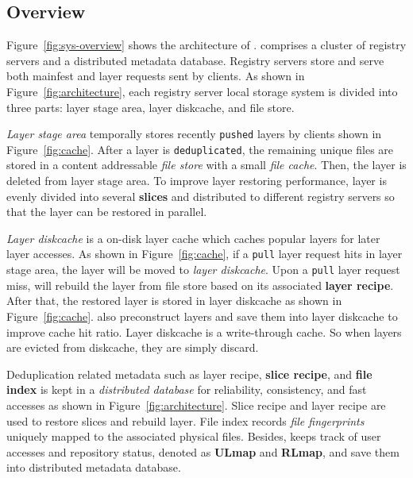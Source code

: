 \vspace{-4pt}
\subsection{Overview}
\label{sec:design}
\vspace{-4pt}


%

Figure~\ref{fig:sys-overview} shows the architecture of \sysname.
 \sysname comprises a cluster of registry servers and a distributed metadata database. 
Registry servers store and serve both mainfest and layer requests sent by clients.
As shown in Figure~\ref{fig:architecture}, 
each registry server local storage system is
divided into three parts: layer stage area, layer diskcache, and file store.

\emph{Layer stage area} temporally stores recently \texttt{pushed} layers by clients shown in Figure~\ref{fig:cache}.
After a layer is \texttt{deduplicated}, 
the remaining unique files are stored in a content 
addressable \emph{file store} with a small \emph{file cache}. 
Then, the layer is deleted from layer stage area.
To improve layer restoring performance, 
layer is evenly divided into several \textbf{slices} and distributed to different registry servers so that
the layer can be restored in parallel.
  
\emph{Layer diskcache} is a on-disk layer cache which caches popular layers for later layer accesses.
As shown in Figure~\ref{fig:cache}, 
if a \texttt{pull} layer request hits in layer stage area,
the layer will be moved to \emph{layer diskcache}.
%
Upon a \texttt{pull} layer request miss, \sysname will rebuild the layer from file store
based on its associated \textbf{layer recipe}. 
After that, the restored layer is stored in layer diskcache as shown in Figure~\ref{fig:cache}.
\sysname also preconstruct layers and save them into layer diskcache to improve cache hit ratio. 
Layer diskcache is a write-through cache.
So when layers are evicted from diskcache, they are simply discard.

Deduplication related metadata such as layer recipe, \textbf{slice recipe}, and \textbf{file index} is kept in a \emph{distributed database} for 
reliability, consistency, and fast accesses as shown in Figure~\ref{fig:architecture}. 
Slice recipe and layer recipe are used to restore slices and rebuild layer.
File index records \emph{file fingerprints} uniquely mapped to the associated physical files. %
Besides, \sysname keeps track of user accesses and repository status, 
denoted as \textbf{ULmap} and \textbf{RLmap}, 
and save them into distributed metadata database.

